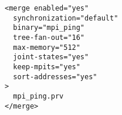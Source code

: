 \begin{verbatim}
<merge enabled="yes" 
  synchronization="default"
  binary="mpi_ping"
  tree-fan-out="16"
  max-memory="512"
  joint-states="yes"
  keep-mpits="yes"
  sort-addresses="yes"
>
  mpi_ping.prv 
</merge>
\end{verbatim}
